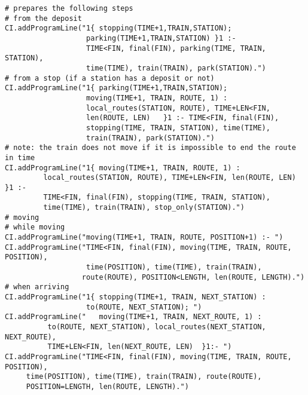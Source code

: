 \documentclass[11pt]{article}
\begin{document}
\begin{verbatim}
# prepares the following steps
# from the deposit
CI.addProgramLine("1{ stopping(TIME+1,TRAIN,STATION);
                   parking(TIME+1,TRAIN,STATION) }1 :-
                   TIME<FIN, final(FIN), parking(TIME, TRAIN, STATION),
                   time(TIME), train(TRAIN), park(STATION).")
# from a stop (if a station has a deposit or not)
CI.addProgramLine("1{ parking(TIME+1,TRAIN,STATION);
                   moving(TIME+1, TRAIN, ROUTE, 1) :
                   local_routes(STATION, ROUTE), TIME+LEN<FIN,
                   len(ROUTE, LEN)   }1 :- TIME<FIN, final(FIN),
                   stopping(TIME, TRAIN, STATION), time(TIME),
                   train(TRAIN), park(STATION).")
# note: the train does not move if it is impossible to end the route in time
CI.addProgramLine("1{ moving(TIME+1, TRAIN, ROUTE, 1) :
         local_routes(STATION, ROUTE), TIME+LEN<FIN, len(ROUTE, LEN) }1 :- 
         TIME<FIN, final(FIN), stopping(TIME, TRAIN, STATION),
         time(TIME), train(TRAIN), stop_only(STATION).")
# moving
# while moving
CI.addProgramLine("moving(TIME+1, TRAIN, ROUTE, POSITION+1) :- ")
CI.addProgramLine("TIME<FIN, final(FIN), moving(TIME, TRAIN, ROUTE, POSITION),
                   time(POSITION), time(TIME), train(TRAIN),
                  route(ROUTE), POSITION<LENGTH, len(ROUTE, LENGTH).")
# when arriving
CI.addProgramLine("1{ stopping(TIME+1, TRAIN, NEXT_STATION) :
                   to(ROUTE, NEXT_STATION); ")
CI.addProgramLine("   moving(TIME+1, TRAIN, NEXT_ROUTE, 1) : 
          to(ROUTE, NEXT_STATION), local_routes(NEXT_STATION, NEXT_ROUTE),
          TIME+LEN<FIN, len(NEXT_ROUTE, LEN)  }1:- ")
CI.addProgramLine("TIME<FIN, final(FIN), moving(TIME, TRAIN, ROUTE, POSITION),
     time(POSITION), time(TIME), train(TRAIN), route(ROUTE),
     POSITION=LENGTH, len(ROUTE, LENGTH).") 
\end{verbatim}
\end{document}
